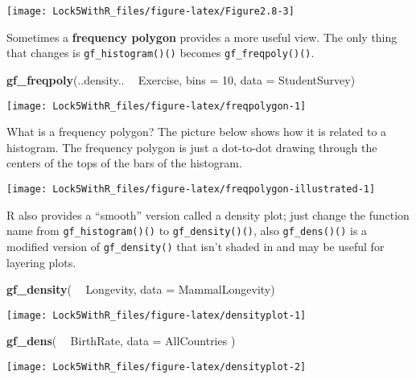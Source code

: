 \documentclass[]{book}
\newenvironment{Shaded}{\begin{snugshade}}{\end{snugshade}}
\newcommand{\DataTypeTok}[1]{\textcolor[rgb]{0.13,0.29,0.53}{#1}}
\newcommand{\DecValTok}[1]{\textcolor[rgb]{0.00,0.00,0.81}{#1}}
\newcommand{\KeywordTok}[1]{\textcolor[rgb]{0.13,0.29,0.53}{\textbf{#1}}}
\newcommand{\NormalTok}[1]{#1}
\newcommand{\OperatorTok}[1]{\textcolor[rgb]{0.81,0.36,0.00}{\textbf{#1}}}
\newcommand{\StringTok}[1]{\textcolor[rgb]{0.31,0.60,0.02}{#1}}
\begin{document}
\texttt{[image: Lock5WithR\_files/figure-latex/Figure2.8-3]}

Sometimes a \textbf{frequency polygon} provides a more useful view.
The only thing that changes is \texttt{gf\_histogram()()} becomes \texttt{gf\_freqpoly()()}.

\begin{Shaded}
\begin{Highlighting}[]
\KeywordTok{gf_freqpoly}\NormalTok{(..density.. }\OperatorTok{~}\StringTok{ }\NormalTok{Exercise, }\DataTypeTok{bins =} \DecValTok{10}\NormalTok{, }\DataTypeTok{data =}\NormalTok{ StudentSurvey)}
\end{Highlighting}
\end{Shaded}

\texttt{[image: Lock5WithR\_files/figure-latex/freqpolygon-1]}

What is a frequency polygon? The picture below shows how it is related to a histogram. The frequency polygon is just a dot-to-dot drawing through the centers of the tops of the bars of the histogram.

\texttt{[image: Lock5WithR\_files/figure-latex/freqpolygon-illustrated-1]}

R also provides a ``smooth'' version called a density plot; just change the function name from \texttt{gf\_histogram()()} to \texttt{gf\_density()()}, also \texttt{gf\_dens()()} is a modified version of \texttt{gf\_density()} that isn't shaded in and may be useful for layering plots.

\begin{Shaded}
\begin{Highlighting}[]
\KeywordTok{gf_density}\NormalTok{( }\OperatorTok{~}\StringTok{ }\NormalTok{Longevity, }\DataTypeTok{data =}\NormalTok{ MammalLongevity)}
\end{Highlighting}
\end{Shaded}

\texttt{[image: Lock5WithR\_files/figure-latex/densityplot-1]}

\begin{Shaded}
\begin{Highlighting}[]
\KeywordTok{gf_dens}\NormalTok{( }\OperatorTok{~}\StringTok{ }\NormalTok{BirthRate, }\DataTypeTok{data =}\NormalTok{ AllCountries )}
\end{Highlighting}
\end{Shaded}

\texttt{[image: Lock5WithR\_files/figure-latex/densityplot-2]}
\end{document}
